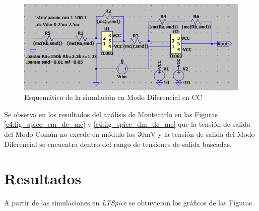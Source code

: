 \begin{figure}[!ht]
\begin{center}
\includegraphics[width=\linewidth]{../Ex4/Informe/res/spice/spice_dm_dc_sch.png}
\caption{Esquemático de la simulación en Modo Diferencial en CC}
\label{e4:fig_spice_dm_dc}
\end{center}
\end{figure}

Se observa en los resultados del análisis de Montecarlo en las Figuras \ref{e4:fig_spice_cm_dc_mc} y \ref{e4:fig_spice_dm_dc_mc} que la tensión de salida del Modo Común no excede en módulo los $30 \si{\milli\volt}$ y la tensión de salida del Modo Diferencial se encuentra dentro del rango de tensiones de salida buscadas.



\section{Resultados}

A partir de las simulaciones en \textit{LTSpice} se obtuvieron los gráficos de las Figuras 

